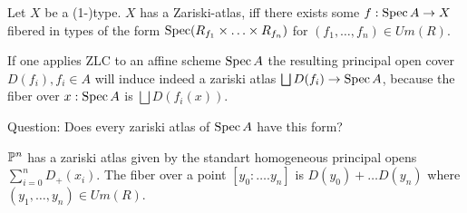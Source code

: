 \documentclass{article}
\begin{document}
\begin{example}
    Let $X$ be a (1-)type. $X$ has a Zariski-atlas, iff there exists some $f : \operatorname{Spec} A \to X$ fibered in types of the form $\operatorname{Spec} (R_{f_1} \times \hdots \times R_{f_n})$ for $(f_1,\hdots,f_n) \in Um(R)$. 
\end{example}
\begin{rmk}{\label{ZLCGivesZariski}}
    If one applies ZLC to an affine scheme $\operatorname{Spec} A$ the resulting principal open cover $D(f_i), f_i \in A$ will induce indeed a zariski atlas $\bigsqcup D(f_i) \to \operatorname{Spec} A$, because the fiber over $x : \operatorname{Spec} A$ is $\bigsqcup D(f_i(x))$.
\end{rmk}
Question: Does every zariski atlas of $\operatorname{Spec} A$ have this form? 

\begin{example}{\label{ex:PnIsStack}}
    $\mathbb{P}^n$ has a zariski atlas given by the standart homogeneous principal opens $\sum_{i=0}^n D_+(x_i)$. The fiber over a point $[y_0 : \hdots . y_n]$ is $D(y_0) + \hdots D(y_n)$ where $(y_1,\hdots,y_n) \in Um(R)$. %
\end{example}
 

\end{document}
